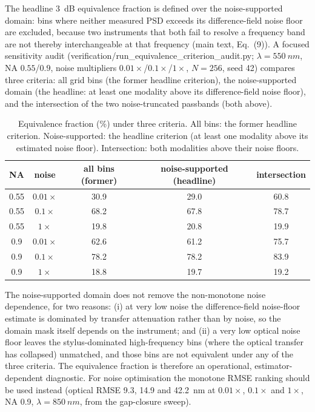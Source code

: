 \documentclass[review,12pt]{elsarticle}
\begin{document}
The headline \SI{3}{dB} equivalence fraction is defined over the noise-supported domain: bins where neither measured PSD exceeds its difference-field noise floor are excluded, because two instruments that both fail to resolve a frequency band are not thereby interchangeable at that frequency (main text, Eq.~(9)). A focused sensitivity audit (verification/run\_equivalence\_criterion\_audit.py; $\lambda=\SI{550}{nm}$, NA $0.55$/$0.9$, noise multipliers $0.01\times$/$0.1\times$/$1\times$, $N=256$, seed 42) compares three criteria: all grid bins (the former headline criterion), the noise-supported domain (the headline: at least one modality above its difference-field noise floor), and the intersection of the two noise-truncated passbands (both above).

\begin{table}[htbp]
    \centering
    \caption{Equivalence fraction (\%) under three criteria. All bins: the former headline criterion. Noise-supported: the headline criterion (at least one modality above its estimated noise floor). Intersection: both modalities above their noise floors.}
    \label{tab:criteria}
    \small
    \begin{tabular}{ccccc}
        \toprule
        NA & noise & all bins (former) & noise-supported (headline) & intersection \\
        \midrule
        0.55 & $0.01\times$ & 30.9 & 29.0 & 60.8 \\
        0.55 & $0.1\times$  & 68.2 & 67.8 & 78.7 \\
        0.55 & $1\times$    & 19.8 & 20.8 & 19.9 \\
        0.9  & $0.01\times$ & 62.6 & 61.2 & 75.7 \\
        0.9  & $0.1\times$  & 78.2 & 78.2 & 83.9 \\
        0.9  & $1\times$    & 18.8 & 19.7 & 19.2 \\
        \bottomrule
    \end{tabular}
\end{table}

The noise-supported domain does not remove the non-monotone noise dependence, for two reasons: (i) at very low noise the difference-field noise-floor estimate is dominated by transfer attenuation rather than by noise, so the domain mask itself depends on the instrument; and (ii) a very low optical noise floor leaves the stylus-dominated high-frequency bins (where the optical transfer has collapsed) unmatched, and those bins are not equivalent under any of the three criteria. The equivalence fraction is therefore an operational, estimator-dependent diagnostic. For noise optimisation the monotone RMSE ranking should be used instead (optical RMSE \SI{9.3}{}, \SI{14.9}{} and \SI{42.2}{nm} at $0.01\times$, $0.1\times$ and $1\times$, NA 0.9, $\lambda=\SI{850}{nm}$, from the gap-closure sweep).
\end{document}
